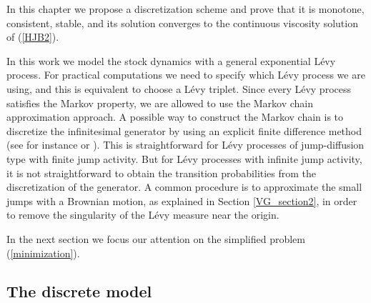 In this chapter we propose a discretization scheme and prove that it is monotone, consistent, stable, and its solution converges to the continuous viscosity
solution of (\ref{HJB2}).

In this work we model the stock dynamics with a general exponential Lévy process. For practical computations we need to specify
which Lévy process we are using, and this is equivalent to choose a Lévy triplet.
Since every L\'evy process satisfies the Markov property, we are allowed to use the Markov chain approximation approach.  
A possible way to construct the Markov chain is to discretize the infinitesimal generator by using an explicit finite difference method
(see for instance \cite{Kushner} or \cite{FlemingSoner}).
This is straightforward for 
Lévy processes of jump-diffusion type with finite jump activity. 
But for Lévy processes with infinite jump activity, it is not straightforward to obtain the transition probabilities from the discretization of the generator.
A common procedure is to approximate the small jumps with a Brownian motion, as explained in Section \ref{VG_section2}, in order to remove
the singularity of the Lévy measure near the origin. 

\noindent
In the next section we focus our attention on the simplified problem (\ref{minimization}). 


\subsection{The discrete model}\label{discrete_model}

